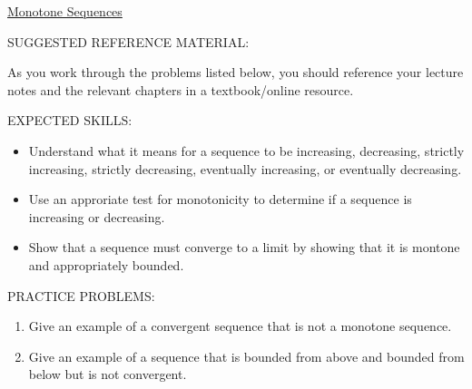 \documentclass[12pt]{article}
\newif\ifans
\begin{document}
\begin{center}
\underline{\LARGE{Monotone Sequences}}
\end{center}

\noindent SUGGESTED REFERENCE MATERIAL:

\medskip

\noindent As you work through the problems listed below, you should reference your lecture notes and the relevant chapters in a textbook/online resource.

\medskip

\noindent EXPECTED SKILLS:

\medskip

\begin{itemize}[topsep=0pt]

\item Understand what it means for a sequence to be increasing, decreasing, strictly increasing, strictly decreasing, eventually increasing, or eventually decreasing. 

\item Use an approriate test for monotonicity to determine if a sequence is increasing or decreasing.

\item Show that a sequence must converge to a limit by showing that it is montone and appropriately bounded.

\end{itemize}

\bigskip

\noindent PRACTICE PROBLEMS:

\begin{enumerate}

\item Give an example of a convergent sequence that is not a monotone sequence. 

\ifans{\fbox{One possibility is $\left\{ (-1)^n \text{ } \frac{1}{n} \right\}_{n = 1}^{+\infty}=-1, \frac{1}{2}, -\frac{1}{3}, \frac{1}{4}, ... $ , which converges to $0$ but is not monotonic.}} \fi

\item Give an example of a sequence that is bounded from above and bounded from below but is not convergent.

\ifans{\fbox{\parbox{1\linewidth}{One possibility is $\left\{ (-1)^n \right\}_{n = 1}^{+\infty}=-1, 1, -1, 1, -1, 1 ... $, which is bounded from above by $1$ (or any number greater than $1$) and is bounded below by $-1$
(or any number less than $-1$).  However, the sequence diverges since its terms oscillate between $1$ and $-1$.}}} \fi


\end{enumerate}
\end{document}
